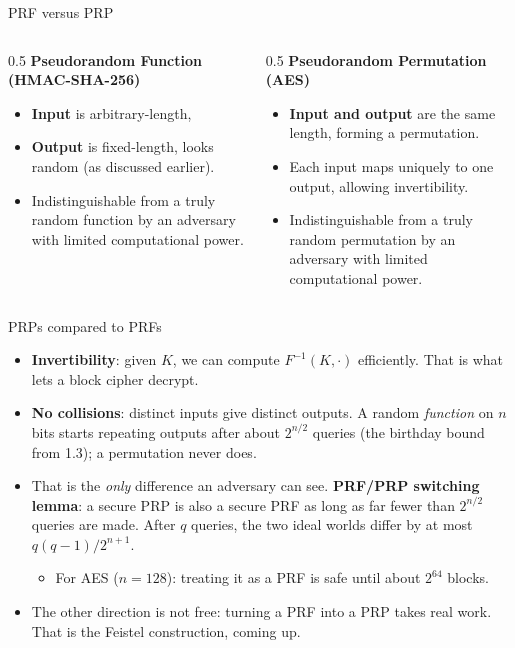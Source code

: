 \ifdefined\PRESENTATION\else\PassOptionsToClass{handout}{beamer}\fi\documentclass[aspectratio=169, lualatex]{beamer}
\begin{document}
\begin{frame}{PRF versus PRP}
	\begin{columns}[c]
		\begin{column}{0.5\textwidth}
			\textbf{Pseudorandom Function (HMAC-SHA-256)}
			\begin{itemize}
				\item \textbf{Input} is arbitrary-length,
				\item \textbf{Output} is fixed-length, looks random (as discussed
				      earlier).
				\item Indistinguishable from a truly random function by an adversary with
				      limited computational power.
			\end{itemize}
		\end{column}
		\pause
		\begin{column}{0.5\textwidth}
			\textbf{Pseudorandom Permutation (AES)}
			\begin{itemize}
				\item \textbf{Input and output} are the same length, forming a permutation.
				\item Each input maps uniquely to one output, allowing invertibility.
				\item Indistinguishable from a truly random permutation by an adversary
				      with limited computational power.
			\end{itemize}
		\end{column}
	\end{columns}
\end{frame}

\begin{frame}{PRPs compared to PRFs}
	\begin{itemize}[<+->]
		\item \textbf{Invertibility}: given $K$, we can compute $F^{-1}(K, \cdot)$ efficiently. That is what lets a block cipher decrypt.
		\item \textbf{No collisions}: distinct inputs give distinct outputs. A random \emph{function} on $n$ bits starts repeating outputs after about $2^{n/2}$ queries (the birthday bound from 1.3); a permutation never does.
		\item That is the \emph{only} difference an adversary can see. \textbf{PRF/PRP switching lemma}: a secure PRP is also a secure PRF as long as far fewer than $2^{n/2}$ queries are made. After $q$ queries, the two ideal worlds differ by at most $q(q-1)/2^{n+1}$.
		      \begin{itemize}
			      \item For AES ($n = 128$): treating it as a PRF is safe until about $2^{64}$ blocks.
		      \end{itemize}
		\item The other direction is not free: turning a PRF into a PRP takes real work. That is the Feistel construction, coming up.
	\end{itemize}
\end{frame}
\end{document}
